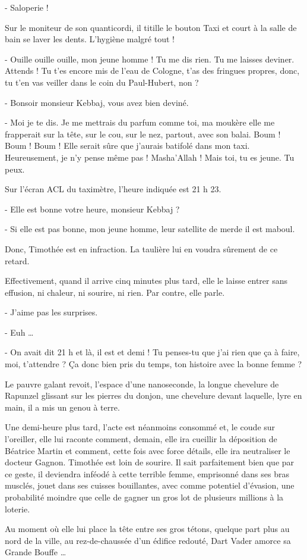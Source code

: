 - Saloperie !

Sur le moniteur de son quanticordi, il titille le bouton Taxi et court à la salle de bain se laver les dents. L’hygiène malgré tout !

- Ouille ouille ouille, mon jeune homme ! Tu me dis rien. Tu me laisses deviner. Attends ! Tu t’es encore mis de l’eau de Cologne, t’as des fringues propres, donc, tu t’en vas veiller dans le coin du Paul-Hubert, non ?

- Bonsoir monsieur Kebbaj, vous avez bien deviné.

- Moi je te dis. Je me mettrais du parfum comme toi, ma moukère elle me frapperait sur la tête, sur le cou, sur le nez, partout, avec son balai. Boum ! Boum ! Boum ! Elle serait sûre que j’aurais batifolé dans mon taxi. Heureusement, je n’y pense même pas ! Masha’Allah ! Mais toi, tu es jeune. Tu peux.

Sur l’écran ACL du taximètre, l’heure indiquée est 21 h 23.

- Elle est bonne votre heure, monsieur Kebbaj ?

- Si elle est pas bonne, mon jeune homme, leur satellite de merde il est maboul.

Donc, Timothée est en infraction. La taulière lui en voudra sûrement de ce retard.

Effectivement, quand il arrive cinq minutes plus tard, elle le laisse entrer sans effusion, ni chaleur, ni sourire, ni rien. Par contre, elle parle.

- J’aime pas les surprises.

- Euh …

- On avait dit 21 h et là, il est et demi ! Tu penses-tu que j’ai rien que ça à faire, moi, t’attendre ? Ça donc bien pris du temps, ton histoire avec la bonne femme ?

Le pauvre galant revoit, l’espace d’une nanoseconde, la longue chevelure de Rapunzel glissant sur les pierres du donjon, une chevelure devant laquelle, lyre en main, il a mis un genou à terre.

Une demi-heure plus tard, l’acte est néanmoins consommé et, le coude sur l’oreiller, elle lui raconte comment, demain, elle ira cueillir la déposition de Béatrice Martin et comment, cette fois avec force détails, elle ira neutraliser le docteur Gagnon. Timothée est loin de sourire. Il sait parfaitement bien que par ce geste, il deviendra inféodé à cette terrible femme, emprisonné dans ses bras musclés, jouet dans ses cuisses bouillantes, avec comme potentiel d’évasion, une probabilité moindre que celle de gagner un gros lot de plusieurs millions à la loterie.

Au moment où elle lui place la tête entre ses gros tétons, quelque part plus au nord de la ville, au rez-de-chaussée d’un édifice redouté, Dart Vader amorce sa Grande Bouffe …